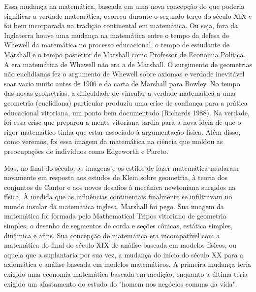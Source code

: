 \documentclass[12pt]{article}
\begin{document}
Essa mudança na matemática, baseada em uma nova concepção do que poderia significar a verdade matemática, ocorreu durante o segundo terço do século XIX e foi bem incorporada na tradição continental em matemática. Ou seja, fora da Inglaterra houve uma mudança na matemática entre o tempo da defesa de Whewell da matemática no processo educacional, o tempo de estudante de Marshall e o tempo posterior de Marshall como Professor de Economia Política. A era matemática de Whewell não era a de Marshall. O surgimento de geometrias não euclidianas fez o argumento de Whewell sobre axiomas e verdade inevitável soar vazio muito antes de 1906 e da carta de Marshall para Bowley. No tempo das novas geometrias, a dificuldade de vincular a verdade matemática a uma geometria (euclidiana) particular produziu uma crise de confiança para a prática educacional vitoriana, um ponto bem documentado (Richards 1988). Na verdade, foi essa crise que preparou a mente vitoriana tardia para a nova ideia de que o rigor matemático tinha que estar associado à argumentação física. Além disso, como veremos, foi essa imagem da matemática na ciência que moldou as preocupações de indivíduos como Edgeworth e Pareto.

Mas, no final do século, as imagens e os estilos de fazer matemática mudaram novamente em resposta aos estudos de Klein sobre geometria, à teoria dos conjuntos de Cantor e aos novos desafios à mecânica newtoniana surgidos na física. À medida que as influências continentais finalmente se infiltravam no mundo insular da matemática inglesa, Marshall foi pego. Sua imagem da matemática foi formada pelo Mathematical Tripos vitoriano de geometria simples, o desenho de segmentos de corda e seções cônicas, estática simples, dinâmica e afins. Sua concepção de matemática era incompatível com a matemática do final do século XIX de análise baseada em modelos físicos, ou aquela que a suplantaria por sua vez, a mudança do início do século XX para a axiomática e análise baseada em modelos matemáticos. A primeira mudança teria exigido uma economia matemática baseada em medição, enquanto a última teria exigido um afastamento do estudo do "homem nos negócios comuns da vida".
\end{document}
